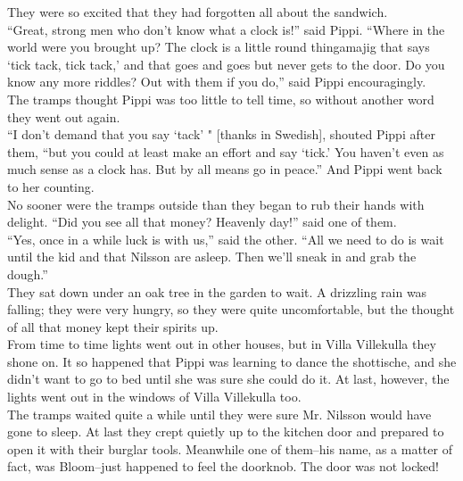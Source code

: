 \documentclass{standard}
\begin{document}
They were so excited that they had forgotten all about the sandwich.\\

“Great, strong men who don’t know what a clock is!” said Pippi. “Where in the world were you brought up? The clock is a little round thingamajig that says ‘tick tack, tick tack,’ and that goes and goes but never gets to the door. Do you know any more riddles? Out with them if you do,” said Pippi encouragingly.\\

The tramps thought Pippi was too little to tell time, so without another word they went out again.\\

“I don’t demand that you say ‘tack’ " [thanks in Swedish], shouted Pippi after them, “but you could at least make an effort and say ‘tick.’ You haven’t even as much sense as a clock has. But by all means go in peace.” And Pippi went back to her counting.\\

No sooner were the tramps outside than they began to rub their hands with delight. “Did you see all that money? Heavenly day!” said one of them.\\

“Yes, once in a while luck is with us,” said the other. “All we need to do is wait until the kid and that Nilsson are asleep. Then we’ll sneak in and grab the dough.”\\

They sat down under an oak tree in the garden to wait. A drizzling rain was falling; they were very hungry, so they were quite uncomfortable, but the thought of all that money kept their spirits up.\\

From time to time lights went out in other houses, but in Villa Villekulla they shone on. It so happened that Pippi was learning to dance the shottische, and she didn’t want to go to bed until she was sure she could do it. At last, however, the lights went out in the windows of Villa Villekulla too.\\

The tramps waited quite a while until they were sure Mr. Nilsson would have gone to sleep. At last they crept quietly up to the kitchen door and prepared to open it with their burglar tools. Meanwhile one of them--his name, as a matter of fact, was Bloom--just happened to feel the doorknob. The door was not locked!\\
\end{document}
